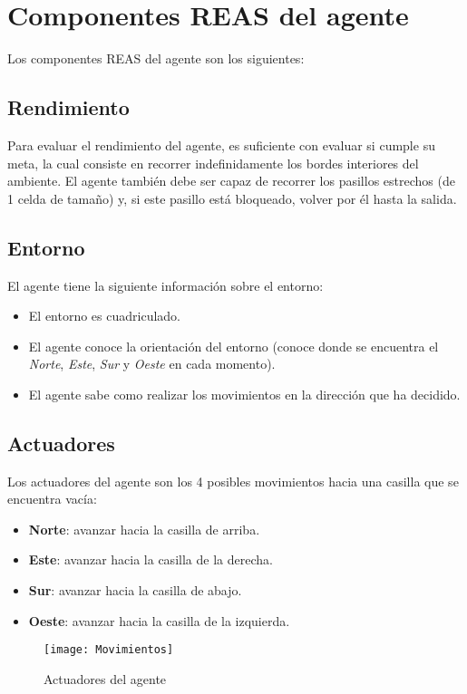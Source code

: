 \section{Componentes REAS del agente}
Los componentes REAS del agente son los siguientes:

\subsection{Rendimiento}
Para evaluar el rendimiento del agente, es suficiente con evaluar si cumple su meta, la cual consiste en recorrer indefinidamente los bordes interiores del ambiente. El agente también debe ser capaz de recorrer los pasillos estrechos (de 1 celda de tamaño) y, si este pasillo está bloqueado, volver por él hasta la salida.

\subsection{Entorno}
El agente tiene la siguiente información sobre el entorno:
\begin{itemize}
    \item El entorno es cuadriculado.
    \item El agente conoce la orientación del entorno (conoce donde se encuentra el \emph{Norte}, \emph{Este}, \emph{Sur} y \emph{Oeste} en cada momento).
    \item El agente sabe como realizar los movimientos en la dirección que ha decidido.
\end{itemize}

\subsection{Actuadores}

Los actuadores del agente son los 4 posibles movimientos hacia una casilla que se encuentra vacía:
\begin{itemize}
    \item \textbf{Norte}: avanzar hacia la casilla de arriba.
    \item \textbf{Este}: avanzar hacia la casilla de la derecha.
    \item \textbf{Sur}: avanzar hacia la casilla de abajo.
    \item \textbf{Oeste}: avanzar hacia la casilla de la izquierda.
\end{itemize}

\begin{figure}[!ht]
    \centering
    \texttt{[image: Movimientos]}
    \caption{Actuadores del agente}
    \label{fig:actuadores}
\end{figure}

